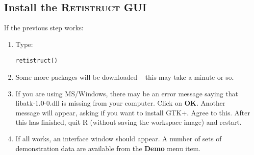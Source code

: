\documentclass{article}
\begin{document}
\subsection{Install the \textsc{Retistruct} GUI}
\label{retistruct-manual:sec:inst-retistr-gui}

If the previous step works:
\begin{enumerate}
\item Type:
\begin{verbatim}
retistruct()
\end{verbatim}
\item Some more packages will be downloaded -- this may take a
  minute or so.
\item If you are using MS/Windows, there may be an error message
  saying that libatk-1.0-0.dll is missing from your computer. Click on
  \textbf{OK}. Another message will appear, asking if you want to
  install GTK+. Agree to this.  After this has finished, quit R
  (without saving the workspace image) and restart.
\item If all works, an interface window should appear. A number of
  sets of demonstration data are available from the \textbf{Demo} menu item.
\end{enumerate}



\end{document}
